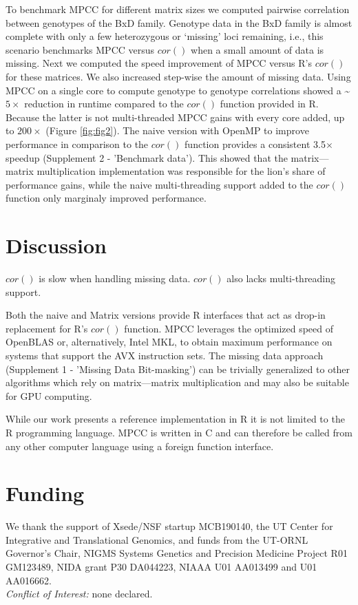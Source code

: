 \documentclass{bioinfo}
\begin{document}
To benchmark MPCC for different matrix sizes we computed pairwise
correlation between genotypes of the BxD family.  Genotype data in the
BxD family is almost complete with only a few heterozygous or
`missing' loci remaining, i.e., this scenario benchmarks MPCC versus
$cor()$ when a small amount of data is missing.  Next we computed the
speed improvement of MPCC versus R's $cor()$ for these matrices. We
also increased step-wise the amount of missing data. Using MPCC on a
single core to compute genotype to genotype correlations showed a
\textasciitilde{}$5\times$ reduction in runtime compared to the $cor()$
function provided in R. Because the latter is not multi-threaded MPCC
gains with every core added, up to $200\times$ (Figure \ref{fig:fig2}).
The naive version with OpenMP to improve performance in comparison to
the $cor()$ function provides a consistent 3.5$\times$ speedup
(Supplement 2 - 'Benchmark data'). This showed that the matrix---matrix
multiplication implementation was responsible for the lion's share of
performance gains, while the naive multi-threading support added to the
$cor()$ function only marginaly improved performance.

\vspace*{2mm}
\section{Discussion}

$cor()$ is slow when handling
missing data. $cor()$ also lacks multi-threading support.

Both the naive and Matrix versions provide R interfaces that act as
drop-in replacement for R's $cor()$ function.  MPCC leverages the
optimized speed of OpenBLAS or, alternatively, Intel\textregistered{}
MKL, to obtain maximum performance on systems that support the
AVX instruction sets.  The missing data
approach (Supplement 1 - 'Missing Data Bit-masking') can be trivially
generalized to other algorithms which rely on matrix---matrix
multiplication and may also be suitable for GPU computing.

While our work presents a reference implementation in R it is not
limited to the R programming language. MPCC is written in C and can
therefore be called from any other computer language using a foreign
function interface.

\section*{Funding}

We thank the support of Xsede/NSF startup MCB190140, the UT Center for
Integrative and Translational Genomics, and funds from the UT-ORNL
Governor's Chair, NIGMS Systems Genetics and Precision Medicine
Project R01 GM123489, NIDA grant P30 DA044223, NIAAA U01 AA013499 and
U01 AA016662.\\
\textit{Conflict of Interest:} none declared.

\vspace*{-5mm}


\end{document}
